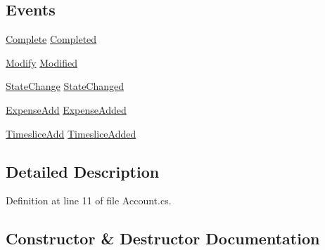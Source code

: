 \subsection*{Events}
\begin{DoxyCompactItemize}
\item 
\hyperlink{namespace_plex_byte_1_1_mo_cap_1_1_interactions_ac81ac3321ab2b018c75ad2c18ec15b9e}{Complete} \hyperlink{class_plex_byte_1_1_mo_cap_1_1_interactions_1_1_account_a2d975974095e091d66e21cfa2d28b9ab}{Completed}
\item 
\hyperlink{namespace_plex_byte_1_1_mo_cap_1_1_interactions_a490186f613e46adce26244f3b2c78a58}{Modify} \hyperlink{class_plex_byte_1_1_mo_cap_1_1_interactions_1_1_account_a79a653b390e022a26200899b77c276cf}{Modified}
\item 
\hyperlink{namespace_plex_byte_1_1_mo_cap_1_1_interactions_af2ff213e81451f96fc74bfad114cecde}{State\+Change} \hyperlink{class_plex_byte_1_1_mo_cap_1_1_interactions_1_1_account_a0a0a49e58be6492cce544f8a6009dc52}{State\+Changed}
\item 
\hyperlink{namespace_plex_byte_1_1_mo_cap_1_1_interactions_a7c03c08c6f524b34193985c455985f1f}{Expense\+Add} \hyperlink{class_plex_byte_1_1_mo_cap_1_1_interactions_1_1_account_ad96bd65da3c69c282a266761593c7cd7}{Expense\+Added}
\item 
\hyperlink{namespace_plex_byte_1_1_mo_cap_1_1_interactions_a600557b92ababd90f6a91c524998565a}{Timeslice\+Add} \hyperlink{class_plex_byte_1_1_mo_cap_1_1_interactions_1_1_account_a10f5bed89fdad33cafcb018e3f4f7bd8}{Timeslice\+Added}
\end{DoxyCompactItemize}


\subsection{Detailed Description}


Definition at line 11 of file Account.\+cs.



\subsection{Constructor \& Destructor Documentation}
